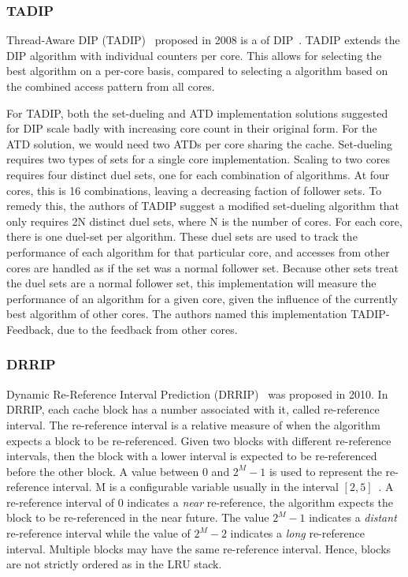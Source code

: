 \subsubsection{TADIP}
Thread-Aware DIP (TADIP)~\cite{Jaleel2008} proposed in 2008 is a of DIP~\cite{Qureshi2007}.
TADIP extends the DIP algorithm with individual counters per core. This allows for selecting the best algorithm on a per-core basis, compared to selecting a algorithm based on the combined access pattern from all cores.

For TADIP, both the set-dueling and ATD implementation solutions suggested for DIP scale badly with increasing core count in their original form.
For the ATD solution, we would need two ATDs per core sharing the cache.
Set-dueling requires two types of sets for a single core implementation.
Scaling to two cores requires four distinct duel sets, one for each combination of algorithms.
At four cores, this is 16 combinations, leaving a decreasing faction of follower sets.
To remedy this, the authors of TADIP suggest a modified set-dueling algorithm that only requires 2N distinct duel sets, where N is the number of cores.
For each core, there is one duel-set per algorithm.
These duel sets are used to track the performance of each algorithm for that particular core, and accesses from other cores are handled as if the set was a normal follower set.
Because other sets treat the duel sets are a normal follower set, this implementation will measure the performance of an algorithm for a given core, given the influence of the currently best algorithm of other cores.
The authors named this implementation TADIP-Feedback, due to the feedback from other cores.

\subsubsection{DRRIP}

Dynamic Re-Reference Interval Prediction (DRRIP)~\cite{Jaleel2010} was proposed in 2010.
In DRRIP, each cache block has a number associated with it, called re-reference interval.
The re-reference interval is a relative measure of when the algorithm expects a block to be re-referenced.
Given two blocks with different re-reference intervals, then the block with a lower interval is expected to be re-referenced before the other block.
A value between 0 and $2^M - 1$ is used to represent the re-reference interval.
M is a configurable variable usually in the interval $[2, 5]$~\cite{Jaleel2010}.
A re-reference interval of 0 indicates a \textit{near} re-reference, the algorithm expects the block to be re-referenced in the near future.
The value $2^M - 1$ indicates a \textit{distant} re-reference interval while the value of $2^M - 2$ indicates a \textit{long} re-reference interval.
Multiple blocks may have the same re-reference interval. 
Hence, blocks are not strictly ordered as in the LRU stack.

